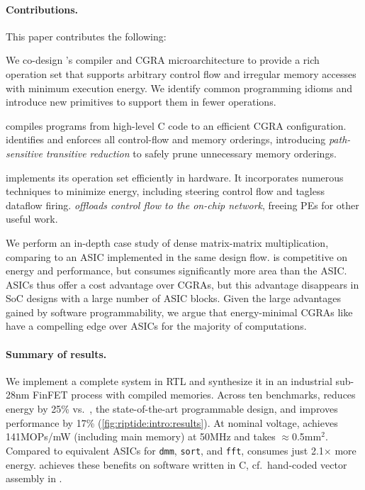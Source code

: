 \paragraph{Contributions.}
This paper contributes the following:
\begin{compactitem}

\item {} We co-design \riptide's
  compiler and CGRA microarchitecture to provide a rich operation set
  that supports arbitrary control flow and irregular memory accesses
  with minimum execution energy.
  We identify common programming idioms and introduce new primitives
  to support them in fewer operations.
  
\item {} \riptide compiles programs from high-level C code
  to an efficient CGRA configuration. \riptide identifies and enforces all
  control-flow and memory orderings, introducing \emph{path-sensitive
  transitive reduction} to safely prune unnecessary memory orderings.
  
\item {} \riptide implements its operation set
  efficiently in hardware. It incorporates numerous techniques to
  minimize energy, including steering control flow and tagless
  dataflow firing. \riptide \emph{offloads control flow to the
  on-chip network}, freeing PEs for other useful work.
  
\item {} We perform
  an in-depth case study of dense matrix-matrix multiplication,
  comparing \riptide to an ASIC implemented in the same design flow. \riptide
  is competitive on energy and performance, but consumes significantly
  more area than the ASIC.
  ASICs thus offer a cost advantage over CGRAs, but this
  advantage disappears in SoC designs with a large number of ASIC
  blocks. Given the large advantages gained by software
  programmability, we argue that energy-minimal CGRAs like \riptide have a
  compelling edge over ASICs for the majority of computations.
\end{compactitem}

\figRipTideIntroResults
\paragraph{Summary of results.}
%
We implement a complete \riptide system in RTL and synthesize it in an
industrial sub-28nm FinFET process with compiled memories.
%
Across ten benchmarks, \riptide reduces energy by
25\% vs.\ \snafu, the state-of-the-art programmable design,
and improves performance by 17\% (\autoref{fig:riptide:intro:results}).
%
At nominal voltage, \riptide achieves 141MOPs/mW (including main memory) at 50MHz
and takes $\approx$0.5mm$^2$.
%
Compared to equivalent ASICs for {\tt dmm}, {\tt sort}, and {\tt fft},
\riptide consumes just 2.1$\times$ more energy.
%
\riptide achieves these benefits on software written in C, cf.\ hand-coded
vector assembly in \snafu.

